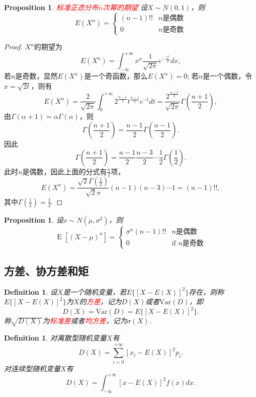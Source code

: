 \documentclass{article}
\newtheorem{proposition}[theorem]{Proposition}
\newtheorem{definition}[theorem]{Definition}
\newcommand{\redt}[1]{\textcolor{red}{#1}}
\begin{document}
\begin{proposition}
\rm \redt{标准正态分布$n$次幂的期望} 设$X \sim N(0,1)$，则
$$
E(X^n) = \left\{  \begin{array}{ll}
(n-1)!! & n\text{是偶数} \\
0	& n\text{是奇数} 
\end{array} \right.
$$
\end{proposition}

\begin{proof}
$X^n$的期望为
$$
E(X^n) = \int_{-\infty}^{+\infty} x^n \frac{1}{\sqrt{2\pi}}e^{-\frac{x^2}{2}}dx,
$$
若$n$是奇数，显然$E(X^n)$是一个奇函数，那么$E(X^n)=0$; 若$n$是一个偶数，令$x=\sqrt{2t}$，则有
$$
E(X^n) = \frac{2}{\sqrt{2\pi}} \int_{0}^{+\infty} 2^{\frac{n-1}{2}}t^{\frac{n-1}{2}}e^{-t}dt = \frac{2^{\frac{n+1}{2}}}{\sqrt{2\pi}} \Gamma(\frac{n+1}{2}),
$$
由$\Gamma(\alpha+1) = \alpha \Gamma(\alpha)$，则
$$
\Gamma(\frac{n+1}{2}) = \frac{n-1}{2}\Gamma(\frac{n-1}{2}).
$$
因此
$$
\Gamma(\frac{n+1}{2}) = \frac{n-1}{2} \frac{n-3}{2}\cdots \frac{1}{2}\Gamma(\frac{1}{2}). 
$$
此时$n$是偶数，因此上面的分式有$\frac{n}{2}$项，
$$
E(X^n) =\frac{\sqrt{2}\Gamma(\frac{1}{2})}{\sqrt{2}\pi}(n-1)(n-3)\cdots 1 =  (n-1)!!,
$$
其中$\Gamma(\frac{1}{2}) = \frac{1}{2}$. 
\end{proof}

\begin{proposition}
\rm 设$x \sim N(\mu,\sigma^2)$，则
$$
\operatorname {E} \left[(X-\mu )^{n}\right]={\begin{cases} \sigma ^{n}(n-1)!!&n\text{是偶数} \\ 0 & {\text{if }} n\text{是奇数} \end{cases}}
$$
\end{proposition}


\newpage
\subsection{方差、协方差和矩}

\begin{definition}
\rm 设$X$是一个随机变量，若$E\{\left[X-E(X)\right]^2\}$存在，则称$E\{\left[X-E(X)\right]^2\}$为$X$的\redt{方差}，记为$D(X)$或者$\text{Var}(D)$，即
$$
D(X) = \text{Var}(D) = E\{\left[X-E(X)\right]^2\}.
$$
称$\sqrt{D(X)}$为\redt{标准差}或者\redt{均方差}，记为$\sigma(X)$. 
\end{definition}

\begin{definition}
\rm  对离散型随机变量$X$有
$$
D(X) = \sum\limits_{i = 0}^{+\infty} \left[ x_i - E(X) \right]^2 p_i.
$$
对连续型随机变量$X$有
$$
D(X) = \int_{-\infty}^{+\infty}\left[x-E(X)\right]^2f(x)dx.
$$
\end{definition}
\end{document}

